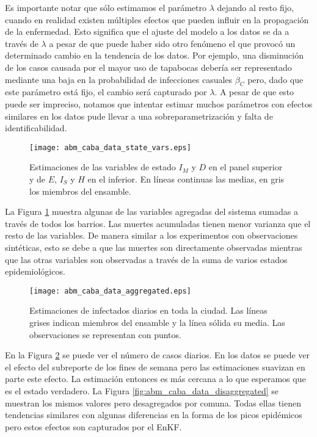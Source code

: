 Es importante notar que sólo estimamos el parámetro $\lambda$ dejando al resto fijo, cuando en realidad existen múltiples efectos que pueden influir en la propagación de la enfermedad. Esto significa que el ajuste del modelo a los datos se da a través de $\lambda$ a pesar de que puede haber sido otro fenómeno el que provocó un determinado cambio en la tendencia de los datos. Por ejemplo, una disminución de los casos causada por el mayor uso de tapabocas debería ser representado mediante una baja en la probabilidad de infecciones casuales $\beta_C$ pero, dado que este parámetro está fijo, el cambio será capturado por $\lambda$. A pesar de que esto puede ser impreciso, notamos que intentar estimar muchos parámetros con efectos similares en los datos pude llevar a una sobreparametrización y falta de identificabilidad.
\begin{figure}[h]
    \centering
    \texttt{[image: abm\_caba\_data\_state\_vars.eps]}
    \caption{Estimaciones de las variables de estado $I_M$ y $D$ en el panel superior y de $E$, $I_S$ y $H$ en el inferior. En líneas continuas las medias, en gris los miembros del ensamble.}
    \label{fig:abm_caba_data_state_vars}
\end{figure}

La Figura \ref{fig:abm_caba_data_state_vars} muestra algunas de las variables agregadas del sistema sumadas a través de todos los barrios. Las muertes acumuladas tienen menor varianza que el resto de las variables. De manera similar a los experimentos con observaciones sintéticas, esto se debe a que las muertes son directamente observadas mientras que las otras variables son observadas a través de la suma de varios estados epidemiológicos.
\begin{figure}[h]
    \centering
    \texttt{[image: abm\_caba\_data\_aggregated.eps]}
    \caption{Estimaciones de infectados diarios en toda la ciudad. Las líneas grises indican miembros del ensamble y la línea sólida su media. Las observaciones se representan con puntos.}
    \label{fig:abm_caba_data_aggregated}
\end{figure}

En la Figura \ref{fig:abm_caba_data_aggregated} se puede ver el número de casos diarios. En los datos se puede ver el efecto del subreporte de los fines de semana pero las estimaciones suavizan en parte este efecto. La estimación entonces es más cercana a lo que esperamos que es el estado verdadero. La Figura \ref{fig:abm_caba_data_disaggregated} se muestran los mismos valores pero desagregados por comuna. Todas ellas tienen tendencias similares con algunas diferencias en la forma de los picos epidémicos pero estos efectos son capturados por el EnKF.

